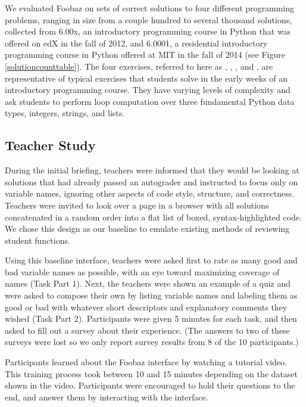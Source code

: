 {{We evaluated Foobaz on sets of correct solutions to four different programming problems, ranging in size from a couple hundred to several thousand solutions, collected from 6.00x, an introductory programming course in Python that was offered on edX in the fall of 2012, and 6.0001, a residential introductory programming course in Python offered at MIT in the fall of 2014 (see Figure \ref{solutioncounttable}). The four exercises, referred to here as , , , and , are representative of typical exercises that students solve in the early weeks of an introductory programming course. They have varying levels of complexity and ask students to perform loop computation over three fundamental Python data types, integers, strings, and lists.

\subsection{Teacher Study}

During the initial briefing, teachers were informed that they would be looking at solutions that had already passed an autograder and instructed to focus only on variable names, ignoring other aspects of code style, structure, and correctness. Teachers were invited to look over a page in a browser with all solutions concatenated in a random order into a flat list of boxed, syntax-highlighted code. We chose this design as our baseline to emulate existing methods of reviewing student functions. 

Using this baseline interface, teachers were asked first to rate as many good and bad variable names as possible, with an eye toward maximizing coverage of names (Task Part 1). Next, the teachers were shown an example of a quiz and were asked to compose their own by listing variable names and labeling them as good or bad with whatever short descriptors and explanatory comments they wished (Task Part 2). Participants were given 5 minutes for each task, and then asked to fill out a survey about their experience. (The answers to two of these surveys were lost so we only report survey results from 8 of the 10 participants.)

Participants learned about the Foobaz interface by watching a tutorial video. This training process took between 10 and 15 minutes depending on the dataset shown in the video. Participants were encouraged to hold their questions to the end, and answer them by interacting with the interface. 

}}
